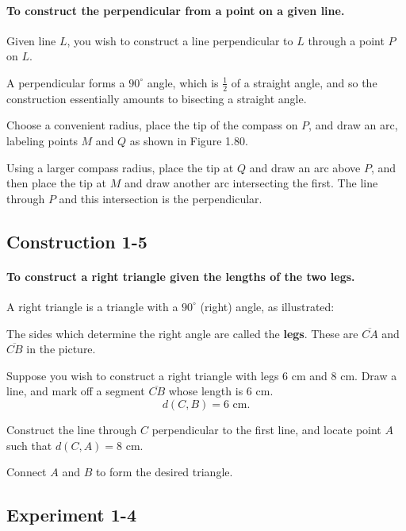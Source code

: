 \documentclass[12pt]{book} %
\begin{document}
\paragraph{To construct the perpendicular from a point on a given line.}

Given line $L$, you wish to construct a line perpendicular to $L$ through a point $P$ on $L$.

A perpendicular forms a $90^\circ$ angle, which is $\frac12$ of a straight angle, and so the construction essentially amounts to bisecting a straight angle.

Choose a convenient radius, place the tip of the compass on $P$, and draw an arc, labeling points $M$ and $Q$ as shown in Figure 1.80.


Using a larger compass radius, place the tip at $Q$ and draw an arc above $P$, and then place the tip at $M$ and draw another arc intersecting the first. The line through $P$ and this intersection is the perpendicular.


\subsection*{Construction 1-5}

\paragraph{To construct a right triangle given the lengths of the two legs.}

A right triangle is a triangle with a $90^\circ$ (right) angle, as illustrated:


The sides which determine the right angle are called the \textbf{legs}. These are $\overline{CA}$ and $\overline{CB}$ in the picture.

Suppose you wish to construct a right triangle with legs $6$ cm and $8$ cm. Draw a line, and mark off a segment $\overline{CB}$ whose length is $6$ cm.
\[
d(C,B)=6\text{ cm}.
\]

Construct the line through $C$ perpendicular to the first line, and locate point $A$ such that $d(C,A)=8$ cm.


Connect $A$ and $B$ to form the desired triangle.

\subsection*{Experiment 1-4}
\end{document}

